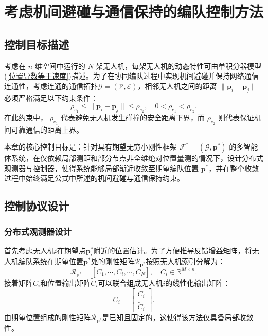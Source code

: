 \chapter{考虑机间避碰与通信保持的编队控制方法}

\section{控制目标描述}
考虑在 $n$ 维空间中运行的 $N$ 架无人机，每架无人机的动态特性可由单积分器模型(\ref{位置导数等于速度})描述。为了在协同编队过程中实现机间避碰并保持网络通信连通性，考虑连通的通信拓扑$\mathcal{G} = (\mathcal{V}, \mathcal{E})$，相邻无人机之间的距离 $\|\mathbf{p}_i - \mathbf{p}_j\|$ 必须严格满足以下约束条件：
\begin{equation}
	\rho_{e_1} \le \|\mathbf{p}_i - \mathbf{p}_j\| \le \rho_{e_2}, \quad 0 < \rho_{e_1} < \rho_{e_2}.
	\label{距离约束条件}
\end{equation}
在此约束中， $\rho_{e_1}$ 代表避免无人机发生碰撞的安全距离下界，而 $\rho_{e_2}$ 则代表保证机间可靠通信的距离上界。

本章的核心控制目标是：针对具有期望无穷小刚性框架 $\mathcal{F}^* = (\mathcal{G}, \mathbf{p}^*)$ 的多智能体系统，在仅依赖局部测距和部分节点非全维绝对位置量测的情况下，设计分布式观测器与控制器，使得系统能够局部渐近收敛至期望编队位置 $\mathbf{p}^*$，并在整个收敛过程中始终满足公式中所述的机间避碰与通信保持约束。

\section{控制协议设计}

\subsection{分布式观测器设计}
首先考虑无人机$i$在期望点$\mathbf{p}_i^*$附近的位置估计。为了方便推导反馈增益矩阵，将无人机编队系统在期望位置${\mathbf{p}}^*$处的刚性矩阵$\mathcal{R}_{\mathbf{p}^*}$按照无人机索引分解为：
\begin{equation}
	\mathcal{R}_{\mathbf{p}^*} = 
	[\bar{C}_1,\cdots,\bar{C}_i,\cdots,\bar{C}_N],
	\quad
	\bar{C}_i \in \mathbb{R}^{M \times n}.
\end{equation}
接着矩阵$\bar{C}_i$和位置输出矩阵$\tilde{C}_i$可以联合组成无人机$i$的线性化输出矩阵：
\begin{equation}
	C_i = 
	\begin{bmatrix}
		\bar{C}_i \\
		\tilde{C}_i
	\end{bmatrix}.
	\label{非全维位置输出矩阵}
\end{equation}
由期望位置组成的刚性矩阵$\mathcal{R}_{\mathbf{p}^*}$是已知且固定的，这使得该方法仅具备局部收敛性。

